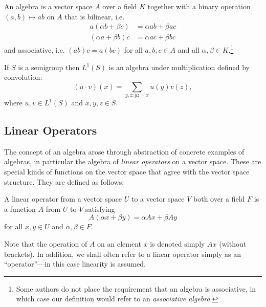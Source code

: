 
\begin{defn}
An algebra is a vector space $A$ over a field $K$ together with a binary operation $(a,b)\mapsto ab$ on $A$ that is bilinear, i.e.
\begin{align*}
a(\alpha b + \beta c) &= \alpha ab + \beta ac\\
(\alpha a+\beta b)c &= \alpha ac + \beta bc
\end{align*}
and associative, i.e. $(ab)c = a(bc)$ for all $a,b,c\in A$ and all $\alpha,\beta \in K$.\footnote{Some authors do not place the requirement that an algebra is associative, in which case our definition would refer to an \emph{associative algebra}.}
\end{defn}


\begin{defn}[Multiplication on $L^1(S)$]
If $S$ is a semigroup then $L^1(S)$ is an algebra under multiplication defined by convolution:
$$(u\cdot v)(x) = \sum_{y,z:yz = x} u(y)v(z),$$
where $u,v \in L^1(S)$ and $x,y,z \in S$.
\end{defn}

\subsection{Linear Operators}
\label{operators}

The concept of an algebra arose through abstraction of concrete examples of algebras, in particular the algebra of \emph{linear operators} on a vector space. These are special kinds of functions on the vector space that agree with the vector space structure.
They are defined as follows:
\begin{defn}
A linear operator from a vector space $U$ to a vector space $V$ both over a field $F$ is a function $A$ from $U$ to $V$ satisfying
$$A(\alpha x + \beta y) = \alpha Ax + \beta Ay$$
for all $x,y \in U$ and $\alpha, \beta \in F$.
\end{defn}
Note that the operation of $A$ on an element $x$ is denoted simply $Ax$ (without brackets). In addition, we shall often refer to a linear operator simply as an ``operator''---in this case linearity is assumed.


